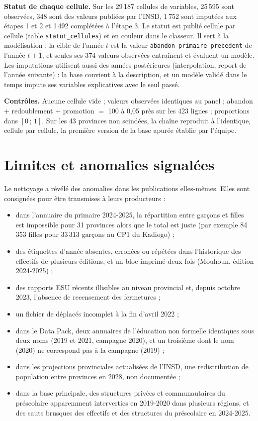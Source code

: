 \documentclass{article}
\begin{document}
\textbf{Statut de chaque cellule.} Sur les 29\,187 cellules de variables, 25\,595 sont observées, 348 sont des valeurs publiées par l'INSD, 1\,752 sont imputées aux étapes 1 et 2 et 1\,492 complétées à l'étape 3. Le statut est publié cellule par cellule (table \texttt{statut\_cellules}) et en couleur dans le classeur. Il sert à la modélisation : la cible de l'année $t$ est la valeur \texttt{abandon\_primaire\_precedent} de l'année $t+1$, et seules ses 374 valeurs observées entraînent et évaluent un modèle. Les imputations utilisent aussi des années postérieures (interpolation, report de l'année suivante) : la base convient à la description, et un modèle validé dans le temps impute ses variables explicatives avec le seul passé.

\textbf{Contrôles.} Aucune cellule vide ; valeurs observées identiques au panel ; abandon $+$ redoublement $+$ promotion $=$ 100 à 0,05 près sur les 423 lignes ; proportions dans $[0\,;\,1]$. Sur les 43 provinces non scindées, la chaîne reproduit à l'identique, cellule par cellule, la première version de la base apurée établie par l'équipe.

\section{Limites et anomalies signalées}

Le nettoyage a révélé des anomalies dans les publications elles-mêmes. Elles sont consignées pour être transmises à leurs producteurs :
\begin{itemize}
\item dans l'annuaire du primaire 2024-2025, la répartition entre garçons et filles est impossible pour 31 provinces alors que le total est juste (par exemple 84\,353 filles pour 33\,313 garçons au CP1 du Kadiogo) ;
\item des étiquettes d'année absentes, erronées ou répétées dans l'historique des effectifs de plusieurs éditions, et un bloc imprimé deux fois (Mouhoun, édition 2024-2025) ;
\item des rapports ESU récents illisibles au niveau provincial et, depuis octobre 2023, l'absence de recensement des fermetures ;
\item un fichier de déplacés incomplet à la fin d'avril 2022 ;
\item dans le Data Pack, deux annuaires de l'éducation non formelle identiques sous deux noms (2019 et 2021, campagne 2020), et un troisième dont le nom (2020) ne correspond pas à la campagne (2019) ;
\item dans les projections provinciales actualisées de l'INSD, une redistribution de population entre provinces en 2028, non documentée ;
\item dans la base principale, des structures privées et communautaires du préscolaire apparemment interverties en 2019-2020 dans plusieurs régions, et des sauts brusques des effectifs et des structures du préscolaire en 2024-2025.
\end{itemize}
\end{document}
